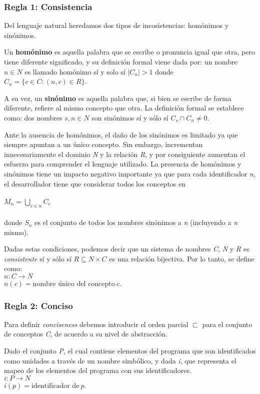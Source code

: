 \subsubsection{Regla 1: Consistencia}
Del lenguaje natural heredamos dos tipos de incosistencias: homónimos y sinónimos.

Un \textbf{homónimo} es aquella palabra que se escribe o pronuncia igual que otra, pero tiene diferente significado, y su definición formal viene dada por: un nombre $n \in N$ es llamado homónimo sí y solo sí $|C_n| > 1$ donde $C_n = \{ c \in C : (n,c) \in R\}$.

A su vez, un \textbf{sinónimo} es aquella palabra que, si bien se escribe de forma diferente, refiere al mismo concepto que otra. La definición formal se establece como: dos nombres $s,n \in N$ son sinónimos sí y sólo sí $C_s \cap C_n \neq 0$.

Ante la ausencia de homónimos, el daño de los sinónimos es limitado ya que siempre apuntan a un único concepto. Sin embargo, incrementan innecesariamente el dominio \textit{N} y la relación \textit{R}, y por consiguiente aumentan el esfuerzo para comprender el lenguaje utilizado. La presencia de homónimos y sinónimos tiene un impacto negativo importante ya que para cada identificador \textit{n}, el desarrollador tiene que considerar todos los conceptos en
\\
\\$M_n = \bigcup_{e \in n} C_e$
\\
\\donde $S_n$ es el conjunto de todos los nombres sinónimos a \textit{n} (incluyendo a \textit{n} mismo).

Dadas estas condiciones, podemos decir que un sistema de nombres \textit{C}, \textit{N} y \textit{R} es \textit{consistente} sí y sólo sí $R \subseteq N \times C$ es una relación bijectiva. Por lo tanto, se define como:
\\$n : C \rightarrow N$
\\$n(c) = \mbox{nombre único del concepto} \ c$.

\subsubsection{Regla 2: Conciso}
Para definir \textit{conciseness} debemos introducir el orden parcial $\sqsubset$ para el conjunto de conceptos \textit{C}, de acuerdo a su nivel de abstracción.

Dado el conjunto \textit{P}, el cual contiene elementos del programa que son identificados como unidades a través de un nombre simbólico, y dada \textit{i}, que representa el mapeo de los elementos del programa con sus identificadores.
\\$i : P \rightarrow N$
\\$i(p) = \mbox{identificador de} \ p$.

